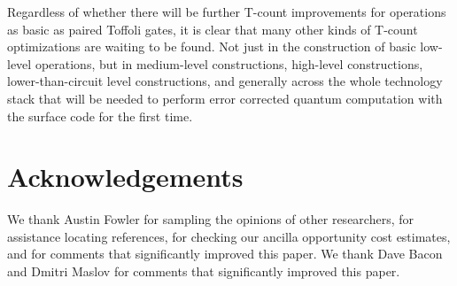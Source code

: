 \documentclass[twocolumn]{quantumarticle-customized}
\begin{document}
Regardless of whether there will be further T-count improvements for operations as basic as paired Toffoli gates, it is clear that many other kinds of T-count optimizations are waiting to be found.
Not just in the construction of basic low-level operations, but in medium-level constructions, high-level constructions, lower-than-circuit level constructions, and generally across the whole technology stack that will be needed to perform error corrected quantum computation with the surface code for the first time.


\section*{Acknowledgements}

We thank Austin Fowler for sampling the opinions of other researchers, for assistance locating references, for checking our ancilla opportunity cost estimates, and for comments that significantly improved this paper.
We thank Dave Bacon and Dmitri Maslov for comments that significantly improved this paper.



\end{document}
